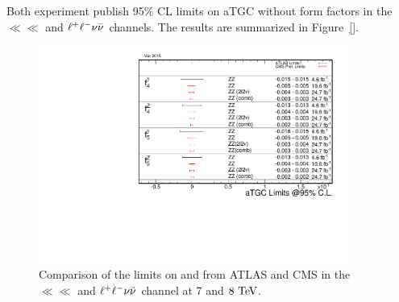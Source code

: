 Both experiment publish 95\% CL limits on aTGC without form factors in the $\ll\ll$ 
and $\ell^+ \ell^-\nu\bar{\nu}$ channels. The results are summarized in Figure~\ref{}.
\begin{figure}[htbp]
  \begin{center}
  \includegraphics[width=0.9\textwidth]{figures/sss-inclboson-diboson-zzprod-aTGC_naTGCf.pdf}
  \caption{ Comparison of the limits on \ffourv and \ffivev from ATLAS and CMS in the $\ll\ll$ and $\ell^+ \ell^-\nu\bar{\nu}$
  channel at 7 and $8\TeV$.}
\label{fig:sss-inclboson-diboson-zzprod-aTGC_naTGCf}
\end{center}
\end{figure}







